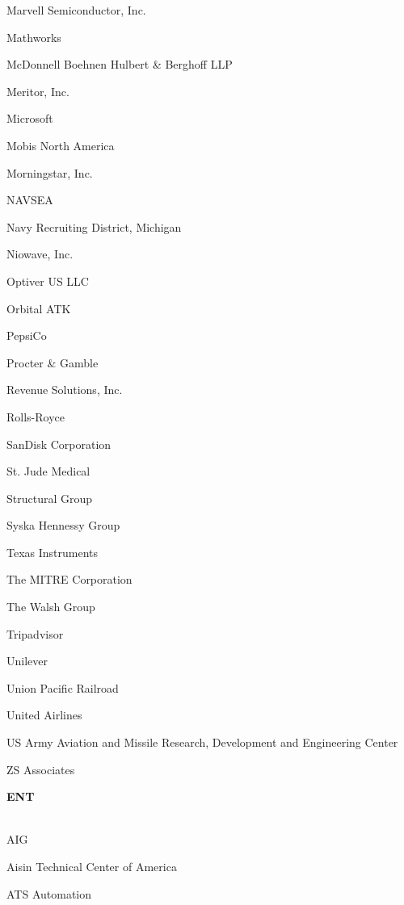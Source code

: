 \documentclass[twoside]{article}
\begin{document}
\begin{center}
\begin{multicols}{5}
\begin{FlushLeft}
\begin{compactitem}
\item Marvell Semiconductor, Inc.
\item Mathworks
\item McDonnell Boehnen Hulbert \& Berghoff LLP
\item Meritor, Inc.
\item Microsoft
\item Mobis North America
\item Morningstar, Inc.
\item NAVSEA
\item Navy Recruiting District, Michigan
\item Niowave, Inc.
\item Optiver US LLC
\item Orbital ATK
\item PepsiCo
\item Procter \& Gamble
\item Revenue Solutions, Inc.
\item Rolls-Royce
\item SanDisk Corporation
\item St. Jude Medical
\item Structural Group
\item Syska Hennessy Group
\item Texas Instruments
\item The MITRE Corporation
\item The Walsh Group
\item Tripadvisor
\item Unilever
\item Union Pacific Railroad
\item United Airlines
\item US Army Aviation and Missile Research, Development and Engineering Center
\item ZS Associates
\end{compactitem}
        \end{FlushLeft}
        \vspace{1em}
        {\fontsize{14}{16}\selectfont \bf ENT}\\
        \vspace{-1em}
        ~\hrulefill~
        \vspace{-.9em}
        \begin{FlushLeft}
        \begin{compactitem}
        \item AIG
\item Aisin Technical Center of America
\item ATS Automation

\end{compactitem}
\end{FlushLeft}
\end{multicols}
\end{center}
\end{document}
